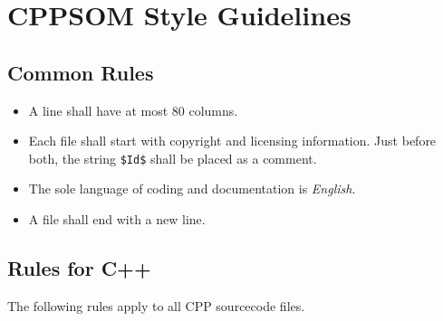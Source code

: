 \documentclass{scrartcl}
\begin{document}
\section{CPPSOM Style Guidelines}
\label{sec:cppsom-style-guid}

\subsection{Common Rules}
\label{sec:common-rules}
\begin{itemize}
\item A line shall have at most 80 columns.
\item Each file shall start with copyright and licensing information.
  Just before both, the string \texttt{\$Id\$} shall be placed as a
  comment.
\item The sole language of coding and documentation is
  \emph{English}.
\item A file shall end with a new line.
\end{itemize}


\subsection{Rules for C++}
\label{sec:rules-cpp}

The following rules apply to all CPP sourcecode files.
\end{document}
